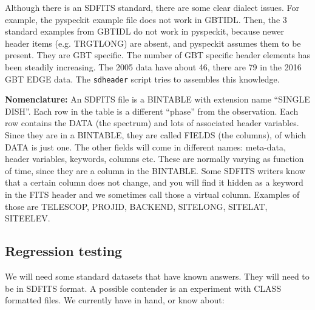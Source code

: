 \documentclass[12pt,a4paper]{article}
\begin{document}
Although there is an SDFITS standard, there are some clear dialect
issues. For example, the pyspeckit example file does not work in
GBTIDL. Then, the 3 standard examples from GBTIDL do not work in
pyspeckit, because newer header items (e.g. TRGTLONG) are absent, and
pyspeckit assumes them to be present. They are GBT specific.  The
number of GBT specific header elements has been steadily
increasing. The 2005 data have about 46, there are 79 in the 2016 GBT
EDGE data. The {\tt sdheader} script tries to assembles this knowledge.


\bigskip\noindent

{\bf Nomenclature:} An SDFITS file is a BINTABLE with extension name
``SINGLE DISH''. Each row in the table is a different ``phase'' from
the observation. Each row contains the DATA (the spectrum) and lots of
associated header variables. Since they are in a BINTABLE, they are
called FIELDS (the columns), of which DATA is just one. The other fields
will come in different names: meta-data, header variables, keywords, columns etc.
These are normally varying as function of time, since they are a column in
the BINTABLE. Some SDFITS writers know that a certain column does not change,
and you will find it hidden as a keyword in the FITS header and we sometimes
call those a virtual column. Examples of those are TELESCOP, PROJID, BACKEND,
SITELONG, SITELAT, SITEELEV.

\subsection{Regression testing}

We will need some standard datasets that have known answers. They will need to be in SDFITS format.
A possible contender is an experiment with CLASS formatted files. We currently have in hand,
or know about:
\end{document}
